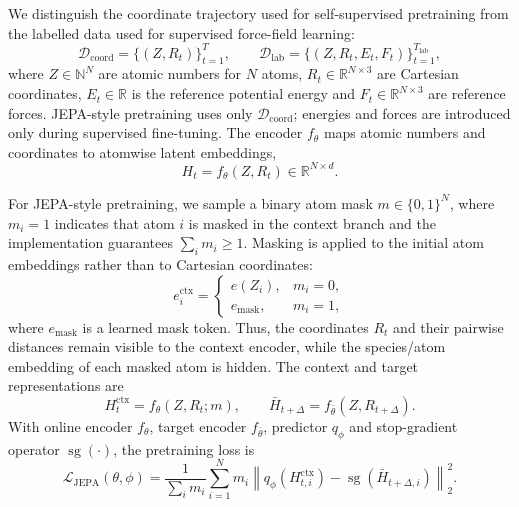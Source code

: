 \documentclass[11pt]{article}
\begin{document}
We distinguish the coordinate trajectory used for self-supervised pretraining from the labelled data used for supervised force-field learning:
\begin{equation}
    \mathcal{D}_{\mathrm{coord}}
    =
    \{(Z,R_t)\}_{t=1}^{T},
    \qquad
    \mathcal{D}_{\mathrm{lab}}
    =
    \{(Z,R_t,E_t,F_t)\}_{t=1}^{T_{\mathrm{lab}}},
\end{equation}
where $Z \in \mathbb{N}^{N}$ are atomic numbers for $N$ atoms, $R_t \in \mathbb{R}^{N \times 3}$ are Cartesian coordinates, $E_t \in \mathbb{R}$ is the reference potential energy and $F_t \in \mathbb{R}^{N \times 3}$ are reference forces. JEPA-style pretraining uses only $\mathcal{D}_{\mathrm{coord}}$; energies and forces are introduced only during supervised fine-tuning. The encoder $f_{\theta}$ maps atomic numbers and coordinates to atomwise latent embeddings,
\begin{equation}
    H_t = f_{\theta}(Z, R_t) \in \mathbb{R}^{N \times d}.
\end{equation}

For JEPA-style pretraining, we sample a binary atom mask $m \in \{0,1\}^{N}$, where $m_i=1$ indicates that atom $i$ is masked in the context branch and the implementation guarantees $\sum_i m_i \ge 1$. Masking is applied to the initial atom embeddings rather than to Cartesian coordinates:
\begin{equation}
    e_i^{\mathrm{ctx}}
    =
    \begin{cases}
    e(Z_i), & m_i = 0,\\
    e_{\mathrm{mask}}, & m_i = 1,
    \end{cases}
\end{equation}
where $e_{\mathrm{mask}}$ is a learned mask token. Thus, the coordinates $R_t$ and their pairwise distances remain visible to the context encoder, while the species/atom embedding of each masked atom is hidden. The context and target representations are
\begin{equation}
    H_t^{\mathrm{ctx}} = f_{\theta}(Z,R_t;m),
    \qquad
    \bar{H}_{t+\Delta} = f_{\bar{\theta}}(Z,R_{t+\Delta}).
\end{equation}
With online encoder $f_{\theta}$, target encoder $f_{\bar{\theta}}$, predictor $q_{\phi}$ and stop-gradient operator $\operatorname{sg}(\cdot)$, the pretraining loss is
\begin{equation}
\mathcal{L}_{\mathrm{JEPA}}(\theta,\phi)
=
\frac{1}{\sum_i m_i}
\sum_{i=1}^{N}
m_i
\left\|
q_{\phi}\!\left(H_{t,i}^{\mathrm{ctx}}\right)
-
\operatorname{sg}\!\left(\bar{H}_{t+\Delta,i}\right)
\right\|_2^2 .
\label{eq:jepa}
\end{equation}
\end{document}
